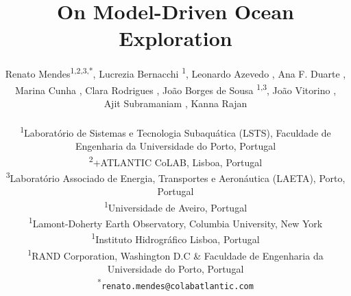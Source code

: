 \documentclass[11pt]{article}
\title{On Model-Driven Ocean Exploration}
\author{
Renato Mendes\textsuperscript{1,2,3,*},
Lucrezia Bernacchi \textsuperscript{1},
Leonardo Azevedo \textsuperscript{},
Ana F. Duarte \textsuperscript{},\\
Marina Cunha \textsuperscript{},
Clara Rodrigues \textsuperscript{},
João Borges de Sousa \textsuperscript{1,3},
João Vitorino \textsuperscript{},\\
Ajit Subramaniam \textsuperscript{},
Kanna Rajan \textsuperscript{}
\\
\\
\textsuperscript{1}{\scriptsize Laboratório de Sistemas e Tecnologia Subaquática (LSTS), Faculdade de Engenharia da Universidade do Porto, Portugal}\\
\textsuperscript{2}{\scriptsize +ATLANTIC CoLAB, Lisboa, Portugal}\\
\textsuperscript{3}{\scriptsize Laboratório Associado de Energia, Transportes e Aeronáutica (LAETA), Porto, Portugal}\\
\textsuperscript{1}{\scriptsize Universidade de Aveiro, Portugal}\\
\textsuperscript{1}{\scriptsize Lamont-Doherty Earth Observatory, Columbia University, New York}\\
\textsuperscript{1}{\scriptsize Instituto Hidrogr{\'a}fico Lisboa, Portugal}\\
\textsuperscript{1}{\scriptsize RAND Corporation, Washington D.C \& Faculdade de Engenharia da Universidade do Porto, Portugal}\\
\textsuperscript{*}\texttt{{\scriptsize renato.mendes@colabatlantic.com}}
}
\date{}
\begin{document}

\maketitle








\footnotesize{
  
}
\end{document}

